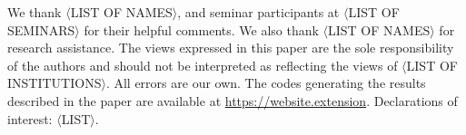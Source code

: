 \protect\linespread{1}\protect\selectfont
We thank \(\langle\)LIST OF NAMES\(\rangle\), and seminar participants at \(\langle\)LIST OF SEMINARS\(\rangle\) for their helpful comments. We also thank \(\langle\)LIST OF NAMES\(\rangle\) for research assistance. The views expressed in this paper are the sole responsibility of the authors and should not be interpreted as reflecting the views of \(\langle\)LIST OF INSTITUTIONS\(\rangle\). All errors are our own. The codes generating the results described in the paper are available at \url{https://website.extension}. Declarations of interest: \(\langle\)LIST\(\rangle\).

